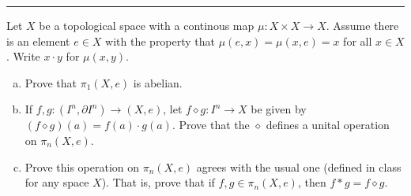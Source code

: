 \documentclass[a4paper, 12pt]{article}
\begin{document}
\noindent\rule{7in}{2.8pt}
\begin{problem}{2}
Let \(X\) be a topological space with a continous map \(\mu:X\times X\rightarrow X\). Assume there is an element \(e\in X\) with the property that \(\mu(e,x)=\mu(x,e)=x\) for all 
\(x\in X\). Write \(x\cdot y\) for \(\mu(x,y)\).
\begin{enumerate}[(a)]
\item Prove that \(\pi_1(X,e)\) is abelian.
\item If \(f,g:(I^n,\partial I^n)\rightarrow (X,e)\), let \(f\diamond g:I^n\rightarrow X\) be given by \((f\diamond g)(a)=f(a)\cdot g(a)\). Prove that the \(\diamond\) defines a unital operation on \(\pi_n(X,e)\).
\item Prove this operation on \(\pi_n(X,e)\) agrees with the usual one (defined in class for any space \(X\)). That is, prove that if \(f,g\in \pi_n(X,e)\), then \(f*g=f\diamond g\). 
\end{enumerate}
\end{problem}
\end{document}
